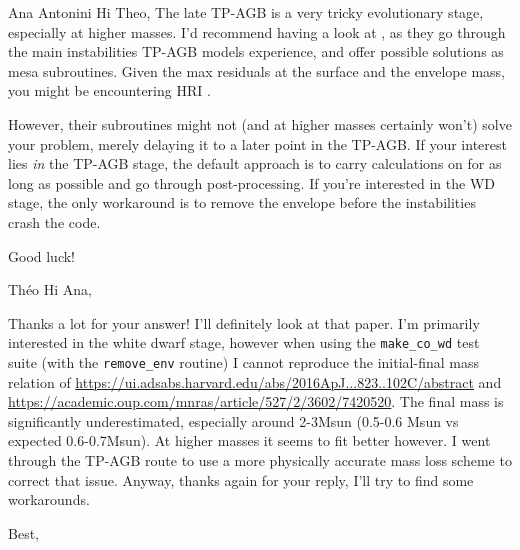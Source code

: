 \documentclass[a4paper,10pt]{article}
\begin{document}
\hspace{0.1\textwidth}\begin{minipage}{1.45\textwidth}
\begin{shadequote}{Ana Antonini}
Hi Theo,
The late TP-AGB is a very tricky evolutionary stage, especially at higher
masses.
I'd recommend having a look at \citet{rees2024a}, as they go
through the main instabilities TP-AGB models experience, and offer possible
solutions as mesa subroutines.
Given  the max residuals  at the surface and the envelope mass, you might
be encountering HRI .

However, their subroutines might not (and at higher masses certainly
won't)  solve your problem, merely delaying it to a later point in the
TP-AGB.
If your interest lies \emph{in} the TP-AGB stage, the default approach is to
carry calculations on for as long as possible and go through
post-processing. If you're interested in the WD stage,  the only
workaround is to remove the envelope before the instabilities crash the
code.

Good luck!
\end{shadequote}
\end{minipage}

\hspace{0.2\textwidth}\begin{minipage}{1.35\textwidth}
\begin{shadequote}{Théo}
Hi Ana,

Thanks a lot for your answer! I’ll definitely look at that paper. I’m primarily interested in the white dwarf stage, however when using the \lstinline[style=output, breaklines=true]|make_co_wd| test suite (with the \lstinline[style=output, breaklines=true]|remove_env| routine) I cannot reproduce the initial-final mass relation of \url{https://ui.adsabs.harvard.edu/abs/2016ApJ...823..102C/abstract} and \url{https://academic.oup.com/mnras/article/527/2/3602/7420520}. The final mass is significantly underestimated, especially around 2-3Msun (0.5-0.6 Msun vs expected 0.6-0.7Msun). At higher masses it seems to fit better however. I went through the TP-AGB route to use a more physically accurate mass loss scheme to correct that issue. Anyway, thanks again for your reply, I’ll try to find some workarounds.

Best,
\end{shadequote}
\end{minipage}
\end{document}
